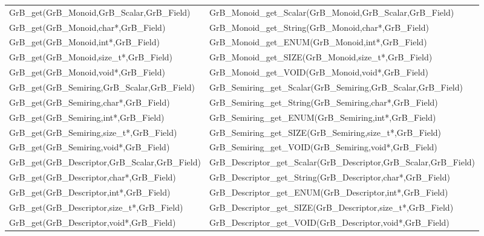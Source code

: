 \begin{table}[htb]
{\begin{tabular}{l|l}
{\sf GrB\_get(GrB\_Monoid,GrB\_Scalar,GrB\_Field)}  & {\sf GrB\_Monoid\_get\_Scalar(GrB\_Monoid,GrB\_Scalar,GrB\_Field)} \\
{\sf GrB\_get(GrB\_Monoid,char*,GrB\_Field)}        & {\sf GrB\_Monoid\_get\_String(GrB\_Monoid,char*,GrB\_Field)}       \\
{\sf GrB\_get(GrB\_Monoid,int*,GrB\_Field)}           & {\sf GrB\_Monoid\_get\_ENUM(GrB\_Monoid,int*,GrB\_Field)}        \\
{\sf GrB\_get(GrB\_Monoid,size\_t*,GrB\_Field)}       & {\sf GrB\_Monoid\_get\_SIZE(GrB\_Monoid,size\_t*,GrB\_Field)}    \\
{\sf GrB\_get(GrB\_Monoid,void*,GrB\_Field)}          & {\sf GrB\_Monoid\_get\_VOID(GrB\_Monoid,void*,GrB\_Field)}       \\
\hline

{\sf GrB\_get(GrB\_Semiring,GrB\_Scalar,GrB\_Field)}  & {\sf GrB\_Semiring\_get\_Scalar(GrB\_Semiring,GrB\_Scalar,GrB\_Field)} \\
{\sf GrB\_get(GrB\_Semiring,char*,GrB\_Field)}        & {\sf GrB\_Semiring\_get\_String(GrB\_Semiring,char*,GrB\_Field)}       \\
{\sf GrB\_get(GrB\_Semiring,int*,GrB\_Field)}           & {\sf GrB\_Semiring\_get\_ENUM(GrB\_Semiring,int*,GrB\_Field)}        \\
{\sf GrB\_get(GrB\_Semiring,size\_t*,GrB\_Field)}       & {\sf GrB\_Semiring\_get\_SIZE(GrB\_Semiring,size\_t*,GrB\_Field)}    \\
{\sf GrB\_get(GrB\_Semiring,void*,GrB\_Field)}          & {\sf GrB\_Semiring\_get\_VOID(GrB\_Semiring,void*,GrB\_Field)}       \\
\hline

{\sf GrB\_get(GrB\_Descriptor,GrB\_Scalar,GrB\_Field)}  & {\sf GrB\_Descriptor\_get\_Scalar(GrB\_Descriptor,GrB\_Scalar,GrB\_Field)} \\
{\sf GrB\_get(GrB\_Descriptor,char*,GrB\_Field)}        & {\sf GrB\_Descriptor\_get\_String(GrB\_Descriptor,char*,GrB\_Field)}       \\
{\sf GrB\_get(GrB\_Descriptor,int*,GrB\_Field)}           & {\sf GrB\_Descriptor\_get\_ENUM(GrB\_Descriptor,int*,GrB\_Field)}        \\
{\sf GrB\_get(GrB\_Descriptor,size\_t*,GrB\_Field)}       & {\sf GrB\_Descriptor\_get\_SIZE(GrB\_Descriptor,size\_t*,GrB\_Field)}    \\
{\sf GrB\_get(GrB\_Descriptor,void*,GrB\_Field)}          & {\sf GrB\_Descriptor\_get\_VOID(GrB\_Descriptor,void*,GrB\_Field)}       \\
\hline


\end{tabular}}
\end{table}
